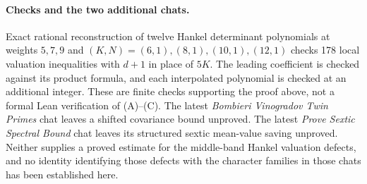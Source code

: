\paragraph{Checks and the two additional chats.}
Exact rational reconstruction of twelve Hankel determinant polynomials
at weights $5,7,9$ and $(K,N)=(6,1),(8,1),(10,1),(12,1)$ checks
178 local valuation inequalities with $d+1$ in place of $5K$.
The leading coefficient is checked against its product formula,
and each interpolated polynomial is checked at an additional integer.
These are finite checks supporting the proof above, not a formal Lean
verification of (A)--(C).
The latest \emph{Bombieri Vinogradov Twin Primes} chat leaves a shifted
covariance bound unproved. The latest \emph{Prove Sextic Spectral Bound}
chat leaves its structured sextic mean-value saving unproved.
Neither supplies a proved estimate for the middle-band Hankel valuation
defects, and no identity identifying those defects with the character
families in those chats has been established here.
